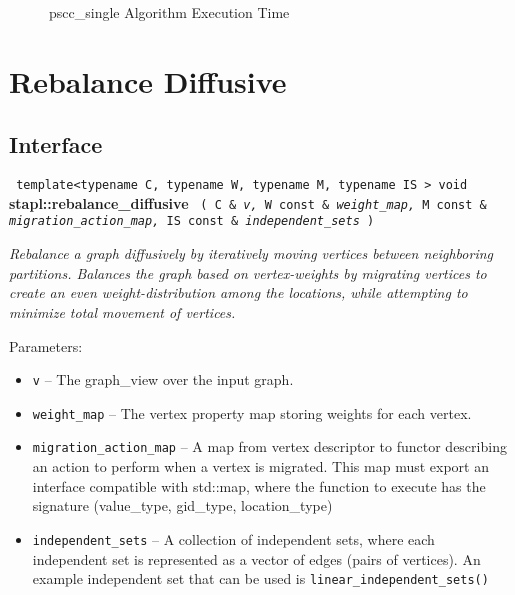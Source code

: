 \begin{figure}[p]
\caption{ pscc\_single Algorithm Execution Time}
\label{fig:pscc-single-alg-exec-exper}
\end{figure}


\section{ Rebalance Diffusive}
\label{sec-rebal-diff-alg}

\subsection{Interface} \label{sec-rebal-diff-alg-inter}

\noindent
\texttt{%
template<typename C, typename W, typename M, typename IS >
\newline
void 
}
\newline
\textbf{stapl::rebalance\_diffusive}%
\newline
\texttt{%
(
C \&
\textit{v,}%
W const \&
\textit{weight\_map,}%
M const \&
\textit{migration\_action\_map,}%
IS const \&
\textit{independent\_sets}
)     
}
\vspace{0.4cm}

\textit{
Rebalance a graph diffusively by iteratively moving vertices between neighboring partitions.  Balances the graph based on vertex-weights by migrating vertices to create an even weight-distribution among the locations, while attempting to minimize total movement of vertices.
}
\vspace{0.4cm}

Parameters:
\begin{itemize}
\item
\texttt{v} --
The graph\_view over the input graph.
\item
\texttt{weight\_map} --
The vertex property map storing weights for each vertex.
\item
\texttt{migration\_action\_map} --
A map from vertex descriptor to functor describing an action to perform when a vertex is migrated. This map must export an interface compatible with std::map, where the function to execute has the signature (value\_type, gid\_type, location\_type)
\item
\texttt{independent\_sets} --
A collection of independent sets, where each independent set is represented as a vector of edges (pairs of vertices). An example independent set that can be used is 
\texttt{linear\_independent\_sets()}
\end{itemize}

